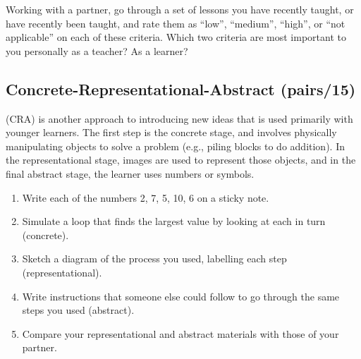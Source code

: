 Working with a partner, go through a set of lessons you have recently
taught, or have recently been taught, and rate them as ``low'', ``medium'',
``high'', or ``not applicable'' on each of these criteria. Which two
criteria are most important to you personally as a teacher? As a
learner?

\subsection*{Concrete-Representational-Abstract (pairs/15)}

 (CRA) is another approach to
introducing new ideas that is used primarily with younger
learners. The first step is the concrete stage, and involves
physically manipulating objects to solve a problem (e.g., piling
blocks to do addition). In the representational stage, images are
used to represent those objects, and in the final abstract stage, the
learner uses numbers or symbols.

\begin{enumerate}
\item
  Write each of the numbers 2, 7, 5, 10, 6 on a sticky note.
\item
  Simulate a loop that finds the largest value by looking at each in
  turn (concrete).
\item
  Sketch a diagram of the process you used, labelling each step
  (representational).
\item
  Write instructions that someone else could follow to go through the
  same steps you used (abstract).
\item
  Compare your representational and abstract materials with those of
  your partner.
\end{enumerate}
